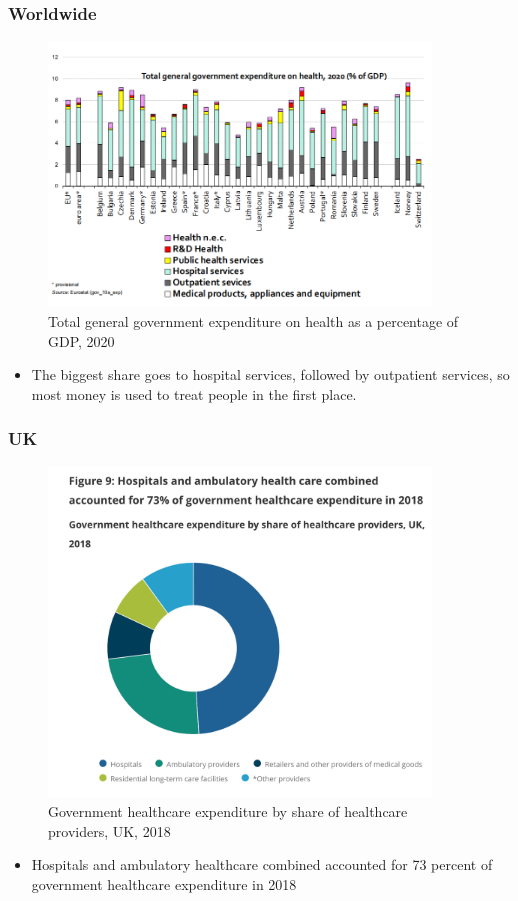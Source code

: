         \subsubsection{Worldwide}
        \begin{figure}[H]%
                \centering
                \includegraphics[width=4in]{images/ch3/10.png}
                \caption{Total general government expenditure on health as a percentage of GDP, 2020}
                \label{fig:label}
            \end{figure} 
\begin{itemize}           
        \item The biggest share goes to hospital services, followed by outpatient services, so most money is used to treat people in the first place.
        \end{itemize}
        
        \subsubsection{UK}
        \begin{figure}[H]%
                \centering
                \includegraphics[width=4in]{images/ch3/18.png}
                \caption{Government healthcare expenditure by share of healthcare providers, UK, 2018}
                \label{fig:label}
            \end{figure} 
 \begin{itemize}           
        \item Hospitals and ambulatory healthcare combined accounted for 73 percent of government healthcare expenditure in 2018
        \end{itemize}              

